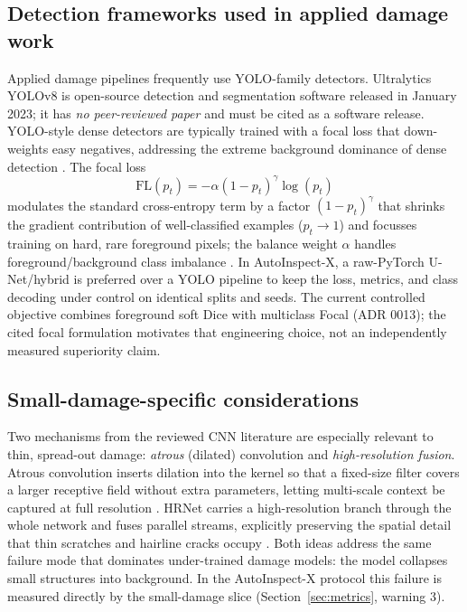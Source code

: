 \documentclass[conference]{IEEEtran}
\begin{document}
\subsection{Detection frameworks used in applied damage work}
\label{sec:detection}
Applied damage pipelines frequently use YOLO-family detectors. Ultralytics
YOLOv8 \cite{yolov8} is open-source detection and segmentation software released
in January 2023; it has \emph{no peer-reviewed paper} and must be cited as a
software release. YOLO-style dense detectors are typically trained with a focal
loss that down-weights easy negatives, addressing the extreme background
dominance of dense detection \cite{lin2017focal}. The focal loss
\begin{equation}
\mathrm{FL}(p_t) = -\alpha (1-p_t)^{\gamma}\log(p_t)
\label{eq:focal}
\end{equation}
modulates the standard cross-entropy term by a factor $(1-p_t)^{\gamma}$ that
shrinks the gradient contribution of well-classified examples ($p_t \to 1$) and
focusses training on hard, rare foreground pixels; the balance weight $\alpha$
handles foreground/background class imbalance \cite{lin2017focal}. In
AutoInspect-X, a raw-PyTorch U-Net/hybrid is preferred over a YOLO pipeline to
keep the loss, metrics, and class decoding under control on identical splits and
seeds. The current controlled objective combines foreground soft Dice with
multiclass Focal (ADR 0013); the cited focal formulation motivates that
engineering choice, not an independently measured superiority claim.

\subsection{Small-damage-specific considerations}
Two mechanisms from the reviewed CNN literature are especially relevant to
thin, spread-out damage: \emph{atrous} (dilated) convolution and
\emph{high-resolution fusion}. Atrous convolution inserts dilation into the
kernel so that a fixed-size filter covers a larger receptive field without
extra parameters, letting multi-scale context be captured at full resolution
\cite{deeplabv3}. HRNet carries a high-resolution branch through the whole
network and fuses parallel streams, explicitly preserving the spatial detail
that thin scratches and hairline cracks occupy \cite{hrnet2020}. Both ideas
address the same failure mode that dominates under-trained damage models: the
model collapses small structures into background. In the AutoInspect-X protocol
this failure is measured directly by the small-damage slice (Section~\ref{sec:metrics},
warning 3).
\end{document}
